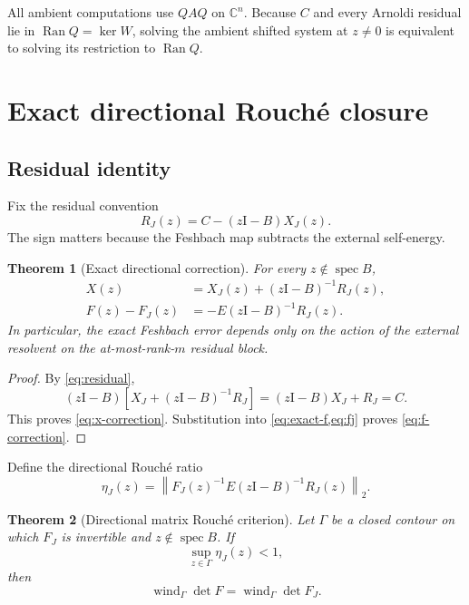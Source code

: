 \documentclass[11pt]{article}
\newtheorem{theorem}{Theorem}[section]
\theoremstyle{definition}
\theoremstyle{remark}
\newcommand{\C}{\mathbb C}
\newcommand{\Id}{\mathrm I}
\newcommand{\Ran}{\operatorname{Ran}}
\newcommand{\spec}{\operatorname{spec}}
\newcommand{\wind}{\operatorname{wind}}
\newcommand{\norm}[1]{\left\lVert#1\right\rVert}
\begin{document}
All ambient computations use \(QAQ\) on \(\C^n\).  Because \(C\) and every
Arnoldi residual lie in \(\Ran Q=\ker W\), solving the ambient shifted
system at \(z\ne0\) is equivalent to solving its restriction to \(\Ran Q\).

\section{Exact directional Rouch\'e closure}
\label{sec:directional-theory}

\subsection{Residual identity}

Fix the residual convention
\begin{equation}
 R_J(z)=C-(z\Id-B)X_J(z).
 \label{eq:residual}
\end{equation}
The sign matters because the Feshbach map subtracts the external
self-energy.

\begin{theorem}[Exact directional correction]
\label{thm:directional-identity}
For every \(z\notin\spec B\),
\begin{align}
 X(z)&=X_J(z)+(z\Id-B)^{-1}R_J(z),
 \label{eq:x-correction}\\
 F(z)-F_J(z)&=-E(z\Id-B)^{-1}R_J(z).
 \label{eq:f-correction}
\end{align}
In particular, the exact Feshbach error depends only on the action of the
external resolvent on the at-most-rank-\(m\) residual block.
\end{theorem}

\begin{proof}
By \cref{eq:residual},
\[
 (z\Id-B)\left[X_J+(z\Id-B)^{-1}R_J\right]
 =(z\Id-B)X_J+R_J=C.
\]
This proves \cref{eq:x-correction}.  Substitution into
\cref{eq:exact-f,eq:fj} proves \cref{eq:f-correction}.
\end{proof}

Define the directional Rouch\'e ratio
\begin{equation}
 \eta_J(z)=
 \norm{F_J(z)^{-1}E(z\Id-B)^{-1}R_J(z)}_2.
 \label{eq:eta}
\end{equation}

\begin{theorem}[Directional matrix Rouch\'e criterion]
\label{thm:directional-rouche}
Let \(\Gamma\) be a closed contour on which \(F_J\) is invertible and
\(z\notin\spec B\).  If
\begin{equation}
 \sup_{z\in\Gamma}\eta_J(z)<1,
 \label{eq:rouche-condition}
\end{equation}
then
\begin{equation}
 \wind_\Gamma\det F=\wind_\Gamma\det F_J.
 \label{eq:winding-transfer}
\end{equation}
\end{theorem}
\end{document}
